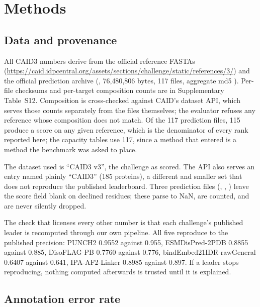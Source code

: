 \section*{Methods}

\subsection*{Data and provenance}

All CAID3 numbers derive from the official reference FASTAs
(\url{https://caid.idpcentral.org/assets/sections/challenge/static/references/3/})
and the official prediction archive (, 76{,}480{,}806
bytes, 117  files, aggregate md5
). Per-file checksums and per-target
composition counts are in Supplementary Table~S12. Composition is cross-checked
against CAID's dataset API, which serves those counts separately from the files
themselves; the evaluator refuses any reference whose composition does not
match. Of the 117 prediction files, 115 produce a score on any given reference,
which is the denominator of every rank reported here; the capacity tables use
117, since a method that entered is a method the benchmark was asked to place.

The dataset used is ``CAID3 v3'', the challenge as scored. The API also serves
an entry named plainly ``CAID3'' (185 proteins), a different and smaller set that
does not reproduce the published leaderboard. Three prediction files
(, , ) leave the
score field blank on declined residues; these parse to NaN, are counted, and are
never silently dropped.

The check that licenses every other number is that each challenge's published
leader is recomputed through our own pipeline. All five reproduce to the
published precision: PUNCH2 0.9552 against 0.955, ESMDisPred-2PDB 0.8855 against
0.885, DisoFLAG-PB 0.7760 against 0.776, bindEmbed21IDR-rawGeneral 0.6407
against 0.641, IPA-AF2-Linker 0.8985 against 0.897. If a leader stops
reproducing, nothing computed afterwards is trusted until it is explained.

\subsection*{Annotation error rate}

